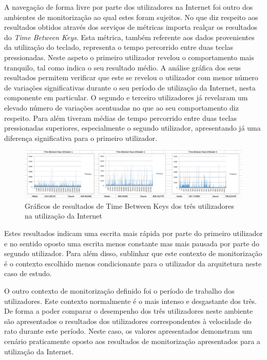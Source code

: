 A navegação de forma livre por parte dos utilizadores na Internet foi outro dos ambientes de monitorização ao qual estes foram sujeitos. No que diz respeito aos resultados obtidos através dos serviços de métricas importa realçar os resultados do \textit{Time Between Keys}. Esta métrica, também referente aos dados provenientes da utilização do teclado, representa o tempo percorrido entre duas teclas pressionadas. Neste aspeto o primeiro utilizador revelou o comportamento mais tranquilo, tal como indica o seu resultado médio. A análise gráfica dos seus resultados permitem verificar que este se revelou o utilizador com menor número de variações significativas durante o seu período de utilização da Internet, nesta componente em particular. O segundo e terceiro utilizadores já revelaram um elevado número de variações acentuadas no que ao seu comportamento diz respeito. Para além tiveram médias de tempo percorrido entre duas teclas pressionadas superiores, especialmente o segundo utilizador, apresentando já uma diferença significativa para o primeiro utilizador.

\begin{figure}[htb]
   \centering
   \includegraphics[scale=0.3]{Images/timebetweenkeys.png}
   \caption{Gráficos de resultados de Time Between Keys dos três utilizadores na utilização da Internet}
\end{figure}

Estes resultados indicam uma escrita mais rápida por parte do primeiro utilizador e no sentido oposto uma escrita menos constante mas mais pausada por parte do segundo utilizador. Para além disso, sublinhar que este contexto de monitorização é o contexto escolhido menos condicionante para o utilizador da arquitetura neste caso de estudo.

O outro contexto de monitorização definido foi o período de trabalho dos utilizadores. Este contexto normalmente é o mais intenso e desgastante dos três. De forma a poder comparar o desempenho dos três utilizadores neste ambiente são apresentados o resultados dos utilizadores correspondentes à velocidade do rato durante este período. Neste caso, os valores apresentados demonstram um cenário praticamente oposto aos resultados de monitorização apresentados para a utilização da Internet.

